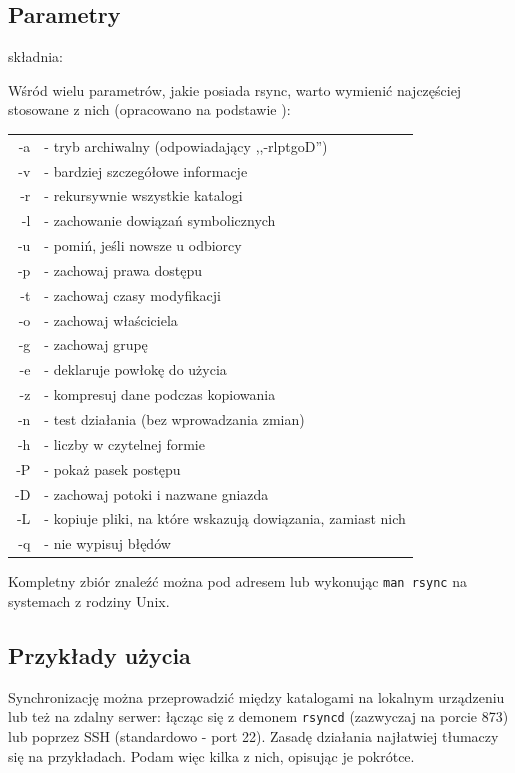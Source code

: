 \subsection{Parametry}
składnia: 

Wśród wielu parametrów, jakie posiada rsync, warto wymienić najczęściej stosowane z nich (opracowano na podstawie \cite{6}):
\begin{center}
\begin{tabular}{ r l }
-a & - tryb archiwalny (odpowiadający ,,-rlptgoD'') \\
-v & - bardziej szczegółowe informacje \\
-r & - rekursywnie wszystkie katalogi \\ 
-l & - zachowanie dowiązań symbolicznych \\
-u & - pomiń, jeśli nowsze u odbiorcy \\
-p & - zachowaj prawa dostępu \\
-t & - zachowaj czasy modyfikacji \\
-o & - zachowaj właściciela \\
-g & - zachowaj grupę \\
-e & - deklaruje powłokę do użycia \\
-z & - kompresuj dane podczas kopiowania \\
-n & - test działania (bez wprowadzania zmian) \\
-h & - liczby w czytelnej formie \\
-P & - pokaż pasek postępu \\
-D & - zachowaj potoki i nazwane gniazda\\
-L & - kopiuje pliki, na które wskazują dowiązania, zamiast nich \\
-q & - nie wypisuj błędów
\end{tabular}
\end{center}
Kompletny zbiór znaleźć można pod adresem \cite{6} lub wykonując \verb|man rsync| na systemach z rodziny Unix.

\subsection{Przykłady użycia}
Synchronizację można przeprowadzić między katalogami na lokalnym urządzeniu lub też na zdalny serwer: łącząc się z demonem \verb|rsyncd| (zazwyczaj na porcie 873) lub poprzez SSH (standardowo - port 22).
Zasadę działania najłatwiej tłumaczy się na przykładach. Podam więc kilka z nich, opisując je pokrótce.

